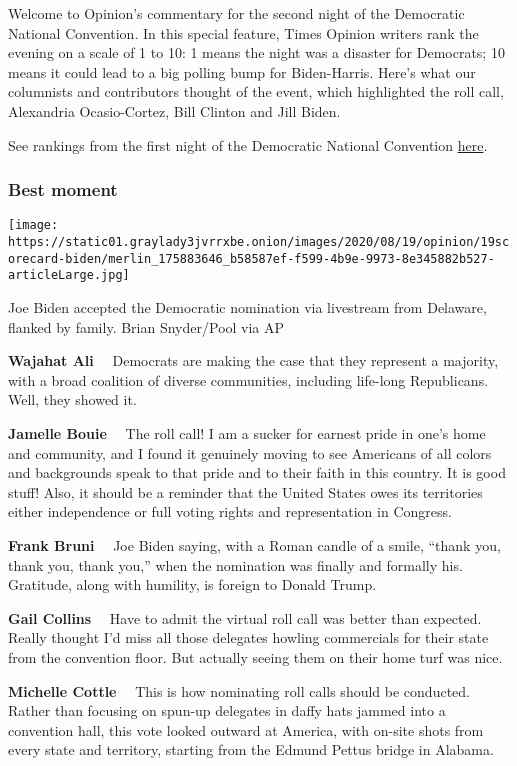 Welcome to Opinion's commentary for the second night of the Democratic
National Convention. In this special feature, Times Opinion writers rank
the evening on a scale of 1 to 10: 1 means the night was a disaster for
Democrats; 10 means it could lead to a big polling bump for
Biden-Harris. Here's what our columnists and contributors thought of the
event, which highlighted the roll call, Alexandria Ocasio-Cortez, Bill
Clinton and Jill Biden.

See rankings from the first night of the Democratic National Convention
\href{https://www.nytimes3xbfgragh.onion/interactive/2020/08/18/opinion/democratic-convention-best-worst.html}{here}.

\hypertarget{best-moment}{%
\subsubsection{Best moment}\label{best-moment}}

\texttt{[image: https://static01.graylady3jvrrxbe.onion/images/2020/08/19/opinion/19scorecard-biden/merlin\_175883646\_b58587ef-f599-4b9e-9973-8e345882b527-articleLarge.jpg]}

Joe Biden accepted the Democratic nomination via livestream from
Delaware, flanked by family. Brian Snyder/Pool via AP

\textbf{Wajahat Ali}~~ Democrats are making the case that they represent
a majority, with a broad coalition of diverse communities, including
life-long Republicans. Well, they showed it.

\textbf{Jamelle Bouie}~~ The roll call! I am a sucker for earnest pride
in one's home and community, and I found it genuinely moving to see
Americans of all colors and backgrounds speak to that pride and to their
faith in this country. It is good stuff! Also, it should be a reminder
that the United States owes its territories either independence or full
voting rights and representation in Congress.

\textbf{Frank Bruni}~~ Joe Biden saying, with a Roman candle of a smile,
``thank you, thank you, thank you,'' when the nomination was finally and
formally his. Gratitude, along with humility, is foreign to Donald
Trump.

\textbf{Gail Collins}~~ Have to admit the virtual roll call was better
than expected. Really thought I'd miss all those delegates howling
commercials for their state from the convention floor. But actually
seeing them on their home turf was nice.

\textbf{Michelle Cottle}~~ This is how nominating roll calls should be
conducted. Rather than focusing on spun-up delegates in daffy hats
jammed into a convention hall, this vote looked outward at America, with
on-site shots from every state and territory, starting from the Edmund
Pettus bridge in Alabama.


